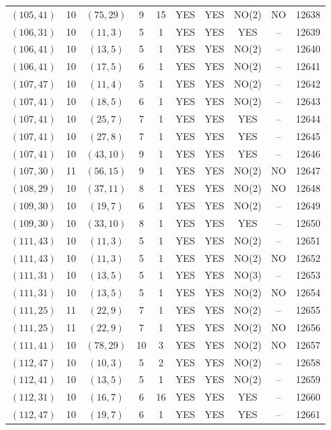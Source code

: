 \begin{longtable}{|c|c|c|c|c|c|c|c|c|c|}
$(105, 41)$ & 10 & $(75, 29)$ & 9 & 15 & YES & YES & NO(2) & NO & 12638\\
$(106, 31)$ & 10 & $(11, 3)$ & 5 & 1 & YES & YES & YES & -- & 12639\\
$(106, 41)$ & 10 & $(13, 5)$ & 5 & 1 & YES & YES & NO(2) & -- & 12640\\
$(106, 41)$ & 10 & $(17, 5)$ & 6 & 1 & YES & YES & NO(2) & -- & 12641\\
$(107, 47)$ & 10 & $(11, 4)$ & 5 & 1 & YES & YES & NO(2) & -- & 12642\\
$(107, 41)$ & 10 & $(18, 5)$ & 6 & 1 & YES & YES & NO(2) & -- & 12643\\
$(107, 41)$ & 10 & $(25, 7)$ & 7 & 1 & YES & YES & YES & -- & 12644\\
$(107, 41)$ & 10 & $(27, 8)$ & 7 & 1 & YES & YES & YES & -- & 12645\\
$(107, 41)$ & 10 & $(43, 10)$ & 9 & 1 & YES & YES & YES & -- & 12646\\
$(107, 30)$ & 11 & $(56, 15)$ & 9 & 1 & YES & YES & NO(2) & NO & 12647\\
$(108, 29)$ & 10 & $(37, 11)$ & 8 & 1 & YES & YES & NO(2) & NO & 12648\\
$(109, 30)$ & 10 & $(19, 7)$ & 6 & 1 & YES & YES & NO(2) & -- & 12649\\
$(109, 30)$ & 10 & $(33, 10)$ & 8 & 1 & YES & YES & YES & -- & 12650\\
$(111, 43)$ & 10 & $(11, 3)$ & 5 & 1 & YES & YES & NO(2) & -- & 12651\\
$(111, 43)$ & 10 & $(11, 3)$ & 5 & 1 & YES & YES & NO(2) & NO & 12652\\
$(111, 31)$ & 10 & $(13, 5)$ & 5 & 1 & YES & YES & NO(3) & -- & 12653\\
$(111, 31)$ & 10 & $(13, 5)$ & 5 & 1 & YES & YES & NO(2) & NO & 12654\\
$(111, 25)$ & 11 & $(22, 9)$ & 7 & 1 & YES & YES & NO(2) & -- & 12655\\
$(111, 25)$ & 11 & $(22, 9)$ & 7 & 1 & YES & YES & NO(2) & NO & 12656\\
$(111, 41)$ & 10 & $(78, 29)$ & 10 & 3 & YES & YES & NO(2) & NO & 12657\\
$(112, 47)$ & 10 & $(10, 3)$ & 5 & 2 & YES & YES & NO(2) & -- & 12658\\
$(112, 41)$ & 10 & $(13, 5)$ & 5 & 1 & YES & YES & NO(2) & -- & 12659\\
$(112, 31)$ & 10 & $(16, 7)$ & 6 & 16 & YES & YES & YES & -- & 12660\\
$(112, 47)$ & 10 & $(19, 7)$ & 6 & 1 & YES & YES & YES & -- & 12661\\

\end{longtable}
